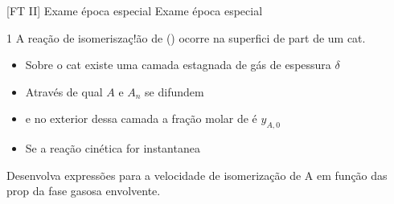\documentclass[\mainfilename]{subfiles}
\begin{document}

[FT II]
{Exame época especial} %
{Exame época especial} %

\begin{questionBox}1{ %
    A reação de isomeriszaç!ão de  () ocorre na superfici de part de um cat.
} %
    \begin{itemize}
        \item Sobre o cat existe uma camada estagnada de gás de espessura \(\delta\)
        \item Através de qual \(A\text{ e }A_n\) se difundem 
        \item e no exterior dessa camada a fração molar de  é \(y_{A,0}\)
        \item Se a reação cinética for instantanea
        
    \end{itemize}
    Desenvolva expressões para a velocidade de isomerização de A em função das prop da fase gasosa envolvente.


\end{questionBox}
\end{document}
